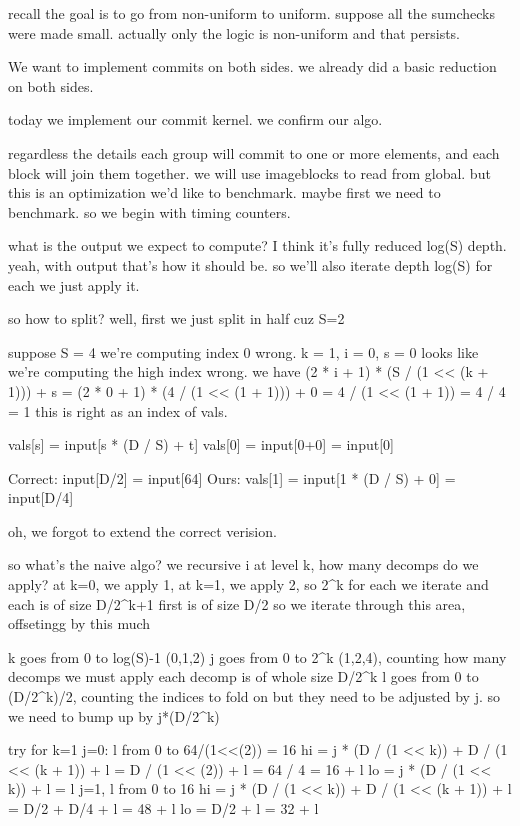 recall the goal is to go from non-uniform to uniform.
suppose all the sumchecks were made small. 
actually only the logic is non-uniform and that persists.





We want to implement commits on both sides.
we already did a basic reduction on both sides.

today we implement our commit kernel.
we confirm our algo.

regardless the details each group will commit to one or more elements, and each block will join them together.
we will use imageblocks to read from global. 
but this is an optimization we'd like to benchmark.
maybe first we need to benchmark. 
so we begin with timing counters.









what is the output we expect to compute?
I think it's fully reduced log(S) depth.
yeah, with output that's how it should be.
so we'll also iterate depth log(S)
for each we just apply it. 

so how to split?
well, first we just split in half cuz S=2

suppose S = 4
we're computing index 0 wrong. 
k = 1, i = 0, s = 0
looks like we're computing the high index wrong.
we have
(2 * i + 1) * (S / (1 << (k + 1))) + s
= (2 * 0 + 1) * (4 / (1 << (1 + 1))) + 0
= 4 / (1 << (1 + 1)) = 4 / 4 = 1
this is right as an index of vals.

vals[s] = input[s * (D / S) + t]
vals[0] = input[0+0] = input[0]

Correct: input[D/2] = input[64]
Ours: vals[1] = input[1 * (D / S) + 0] = input[D/4]

oh, we forgot to extend the correct verision.

so what's the naive algo?
we recursive i
at level k, how many decomps do we apply?
at k=0, we apply 1, at k=1, we apply 2, so 2^k
for each we iterate and each is of size D/2^{k+1}
first is of size D/2
so we iterate through this area, offsetingg by this much

k goes from 0 to log(S)-1 (0,1,2)
j goes from 0 to 2^k (1,2,4), counting how many decomps we must apply
each decomp is of whole size D/2^k
l goes from 0 to (D/2^k)/2, counting the indices to fold on
but they need to be adjusted by j. so we need to bump up by j*(D/2^k)

try for k=1
j=0: l from 0 to 64/(1<<(2)) = 16
    hi = j * (D / (1 << k)) + D / (1 << (k + 1)) + l
        = D / (1 << (2)) + l = 64 / 4 = 16 + l
    lo = j * (D / (1 << k)) + l
        = l
j=1, l from 0 to 16
    hi = j * (D / (1 << k)) + D / (1 << (k + 1)) + l
        = D/2 + D/4 + l = 48 + l
    lo = D/2 + l = 32 + l

